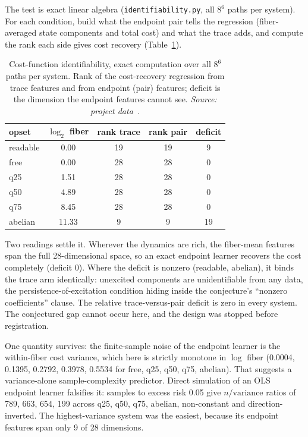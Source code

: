 The test is exact linear algebra (\texttt{identifiability.py}, all $8^6$ paths per system). For each condition, build what the endpoint pair tells the regression (fiber-averaged state components and total cost) and what the trace adds, and compute the rank each side gives cost recovery (Table~\ref{tab:ident}).

\begin{table}[htbp]
\centering\footnotesize
\caption{Cost-function identifiability, exact computation over all $8^6$ paths per system. Rank of the cost-recovery regression from trace features and from endpoint (pair) features; deficit is the dimension the endpoint features cannot see. \emph{Source: project data~\cite{appliedrepo2026}.}}
\label{tab:ident}
\begin{tabular}{lcccc}
\toprule
opset & $\log_2$ fiber & rank trace & rank pair & deficit \\
\midrule
readable & 0.00 & 19 & 19 & 9 \\
free & 0.00 & 28 & 28 & 0 \\
q25 & 1.51 & 28 & 28 & 0 \\
q50 & 4.89 & 28 & 28 & 0 \\
q75 & 8.45 & 28 & 28 & 0 \\
abelian & 11.33 & 9 & 9 & 19 \\
\bottomrule
\end{tabular}
\end{table}

Two readings settle it. Wherever the dynamics are rich, the fiber-mean features span the full 28-dimensional space, so an exact endpoint learner recovers the cost completely (deficit 0). Where the deficit is nonzero (readable, abelian), it binds the trace arm identically: unexcited components are unidentifiable from any data, the persistence-of-excitation condition hiding inside the conjecture's ``nonzero coefficients'' clause. The relative trace-versus-pair deficit is zero in every system. The conjectured gap cannot occur here, and the design was stopped before registration.

One quantity survives: the finite-sample noise of the endpoint learner is the within-fiber cost variance, which here is strictly monotone in $\log$ fiber (0.0004, 0.1395, 0.2792, 0.3978, 0.5534 for free, q25, q50, q75, abelian). That suggests a variance-alone sample-complexity predictor. Direct simulation of an OLS endpoint learner falsifies it: samples to excess risk 0.05 give $n/\mathrm{variance}$ ratios of 789, 663, 654, 199 across q25, q50, q75, abelian, non-constant and direction-inverted. The highest-variance system was the easiest, because its endpoint features span only 9 of 28 dimensions.


